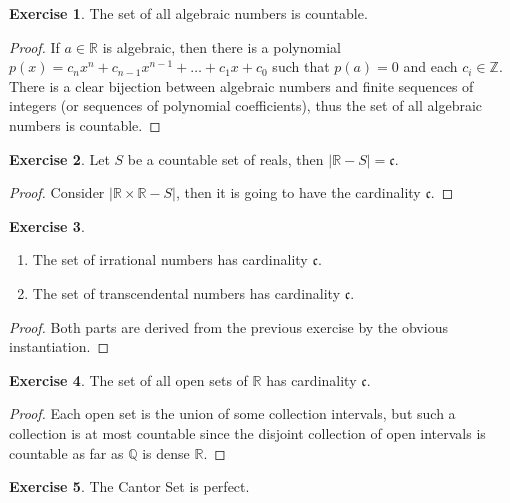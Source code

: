 \documentclass[8pt]{article}
\theoremstyle{definition}
\theoremstyle{definition}
\theoremstyle{definition}
\theoremstyle{definition}
\theoremstyle{definition}
\theoremstyle{definition}
\theoremstyle{definition}
\theoremstyle{definition}
\theoremstyle{definition}
\theoremstyle{definition}
\theoremstyle{definition}
\theoremstyle{definition}
\theoremstyle{definition}
\newtheorem{exercise}{Exercise}[section]
\theoremstyle{definition}
\theoremstyle{question}
\begin{document}
\begin{exercise}
  The set of all algebraic numbers is countable.
\end{exercise}

\begin{proof}
  If $a \in \mathbb{R}$ is algebraic, then there is a polynomial $p(x) = c_n x^n + c_{n - 1} x^{n - 1} + \ldots + c_1 x + c_0$ such
  that $p(a) = 0$ and each $c_i \in \mathbb{Z}$. There is a clear bijection between algebraic numbers and finite sequences of integers
  (or sequences of polynomial coefficients), thus the set of all algebraic numbers is countable.
\end{proof}

\begin{exercise}
  Let $S$ be a countable set of reals, then $|\mathbb{R} - S| = \mathfrak{c}$.
\end{exercise}

\begin{proof}
  Consider $|\mathbb{R} \times \mathbb{R} - S|$, then it is going to have the cardinality $\mathfrak{c}$.
\end{proof}

\begin{exercise}
$ $

\begin{enumerate}
  \item The set of irrational numbers has cardinality $\mathfrak{c}$.
  \item The set of transcendental numbers has cardinality $\mathfrak{c}$.
\end{enumerate}
\end{exercise}

\begin{proof}
Both parts are derived from the previous exercise by the obvious instantiation.
\end{proof}

\begin{exercise}
  The set of all open sets of $\mathbb{R}$ has cardinality $\mathfrak{c}$.
\end{exercise}

\begin{proof}
  Each open set is the union of some collection intervals, but such a collection is at most countable
  since the disjoint collection of open intervals is countable as far as $\mathbb{Q}$ is dense $\mathbb{R}$.
\end{proof}

\begin{exercise}
  The Cantor Set is perfect.
\end{exercise}
\end{document}
